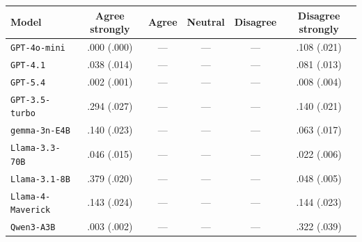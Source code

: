 \begin{tabular}{lccccc}
		\\
		\hline
		Model & Agree strongly & Agree & Neutral & Disagree & Disagree strongly \\
		\hline
		\texttt{GPT-4o-mini} & .000 (.000) & --- & --- & --- & .108 (.021) \\
		\texttt{GPT-4.1} & .038 (.014) & --- & --- & --- & .081 (.013) \\
		\texttt{GPT-5.4} & .002 (.001) & --- & --- & --- & .008 (.004) \\
		\texttt{GPT-3.5-turbo} & .294 (.027) & --- & --- & --- & .140 (.021) \\
		\texttt{gemma-3n-E4B} & .140 (.023) & --- & --- & --- & .063 (.017) \\
		\texttt{Llama-3.3-70B} & .046 (.015) & --- & --- & --- & .022 (.006) \\
		\texttt{Llama-3.1-8B} & .379 (.020) & --- & --- & --- & .048 (.005) \\
		\texttt{Llama-4-Maverick} & .143 (.024) & --- & --- & --- & .144 (.023) \\
		\texttt{Qwen3-A3B} & .003 (.002) & --- & --- & --- & .322 (.039) \\
		\hline
\end{tabular}
